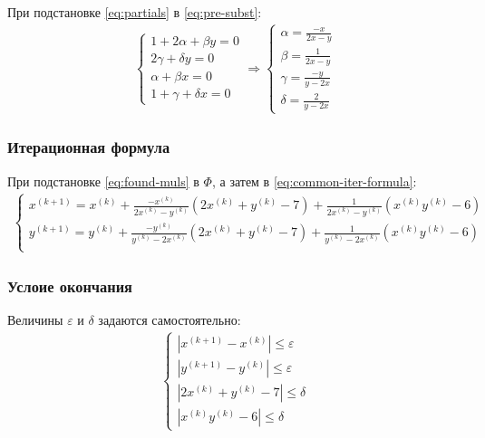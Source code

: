 При подстановке \cref{eq:partials} в \cref{eq:pre-subst}:
\begin{align}\label{eq:found-muls}
	\begin{cases}
		1 + 2 \alpha + \beta y = 0 \\
		2 \gamma + \delta y = 0    \\
		\alpha + \beta x = 0       \\
		1 + \gamma + \delta x = 0
	\end{cases} \Longrightarrow \begin{cases}
		                            \alpha = \frac{-x}{2x - y} \\
		                            \beta = \frac{1}{2x - y}   \\
		                            \gamma = \frac{-y}{y - 2x} \\
		                            \delta = \frac{2}{y - 2x}
	                            \end{cases}
\end{align}

\subsubsection*{Итерационная формула}
При подстановке \cref{eq:found-muls} в \(\Phi\), а затем в \cref{eq:common-iter-formula}:
\begin{align}
	\begin{cases}
		x^{(k + 1)} = x^{(k)} + \frac{-x^{(k)}}{2x^{(k)} - y^{(k)}} (2x^{(k)} + y^{(k)} - 7) + \frac{1}{2x^{(k)}-y^{(k)}} (x^{(k)}y^{(k)} - 6)     \\
		y^{(k + 1)} = y^{(k)} + \frac{-y^{(k)}}{ y^{(k)} - 2x^{(k)} } (2x^{(k)} + y^{(k)} - 7) + \frac{1}{y^{(k)} - 2x^{(k)}} (x^{(k)}y^{(k)} - 6) \\
	\end{cases}
\end{align}
\subsubsection*{Услоие окончания}
Величины \(\varepsilon\) и \(\delta\) задаются самостоятельно:
\begin{align}
	\begin{cases}
		|x^{(k+1)} - x^{(k)}| \leq \varepsilon \\
		|y^{(k+1)} - y^{(k)}| \leq \varepsilon \\
		|2x^{(k)} + y^{(k)} - 7| \leq \delta   \\
		|x^{(k)}y^{(k)} - 6| \leq \delta
	\end{cases}
\end{align}
